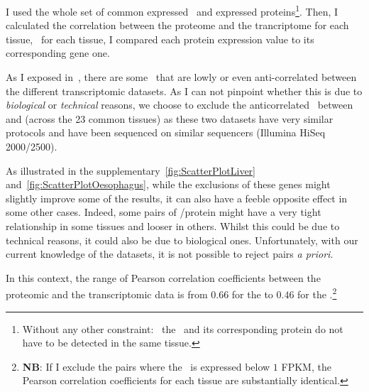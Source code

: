 I used the whole set of common expressed \mRNAs\ and
expressed proteins\footnote{Without any other constraint: \eg\ the \mRNA\ and
its corresponding protein do not have to be detected in the same tissue.}.
Then, I calculated the correlation between the proteome and the trancriptome for
each tissue, \ie\ for each tissue, I compared each protein expression value to
its corresponding gene one.

As I exposed in~, there are some
\mRNAs\ that are lowly or even anti-correlated between the different
transcriptomic datasets.
As I can not pinpoint whether this is due to \emph{biological} or \emph{technical}
reasons, we choose to exclude the anticorrelated \mRNAs\ between  and  (across the 23 common tissues) as these two datasets have
very similar protocols and have been sequenced on similar sequencers (Illumina
HiSeq 2000/2500).

As illustrated in the supplementary~\cref{fig:ScatterPlotLiver}
and~\cref{fig:ScatterPlotOesophagus}, while the exclusions of these genes might
slightly improve some of the results, it can also have a feeble opposite effect
in some other cases.
Indeed, some pairs of \mRNA/protein might have a very tight relationship in some
tissues and looser in others. Whilst this could be due to technical reasons, it
could also be due to biological ones. Unfortunately, with our current knowledge
of the datasets, it is not possible to reject pairs \emph{a priori}.

In this context, the range of Pearson correlation coefficients between the
proteomic and the transcriptomic data is from $0.66$ for the 
to $0.46$ for the .\footnote{\textbf{NB}: If I exclude the
pairs where the \mRNA\ is expressed below $1$ \gls{FPKM}, the Pearson correlation
coefficients for each tissue are substantially identical.}

